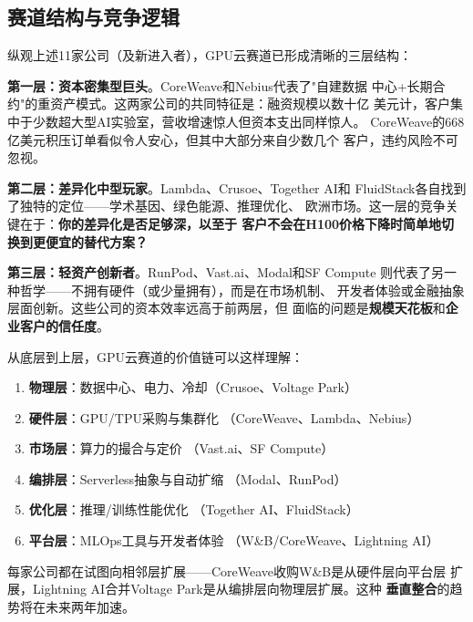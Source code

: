 
\subsection{赛道结构与竞争逻辑}
\label{subsec:gpu-cloud-landscape}

纵观上述11家公司（及新进入者），GPU云赛道已形成清晰的三层结构：

\textbf{第一层：资本密集型巨头}。CoreWeave和Nebius代表了"自建数据
中心+长期合约"的重资产模式。这两家公司的共同特征是：融资规模以数十亿
美元计，客户集中于少数超大型AI实验室，营收增速惊人但资本支出同样惊人。
CoreWeave的668亿美元积压订单看似令人安心，但其中大部分来自少数几个
客户，违约风险不可忽视。

\textbf{第二层：差异化中型玩家}。Lambda、Crusoe、Together AI和
FluidStack各自找到了独特的定位——学术基因、绿色能源、推理优化、
欧洲市场。这一层的竞争关键在于：\textbf{你的差异化是否足够深，以至于
客户不会在H100价格下降时简单地切换到更便宜的替代方案？}

\textbf{第三层：轻资产创新者}。RunPod、Vast.ai、Modal和SF Compute
则代表了另一种哲学——不拥有硬件（或少量拥有），而是在市场机制、
开发者体验或金融抽象层面创新。这些公司的资本效率远高于前两层，但
面临的问题是\textbf{规模天花板}和\textbf{企业客户的信任度}。

\begin{corebox}
从底层到上层，GPU云赛道的价值链可以这样理解：
\begin{enumerate}
  \item \textbf{物理层}：数据中心、电力、冷却（Crusoe、Voltage Park）
  \item \textbf{硬件层}：GPU/TPU采购与集群化
    （CoreWeave、Lambda、Nebius）
  \item \textbf{市场层}：算力的撮合与定价
    （Vast.ai、SF Compute）
  \item \textbf{编排层}：Serverless抽象与自动扩缩
    （Modal、RunPod）
  \item \textbf{优化层}：推理/训练性能优化
    （Together AI、FluidStack）
  \item \textbf{平台层}：MLOps工具与开发者体验
    （W\&B/CoreWeave、Lightning AI）
\end{enumerate}
每家公司都在试图向相邻层扩展——CoreWeave收购W\&B是从硬件层向平台层
扩展，Lightning AI合并Voltage Park是从编排层向物理层扩展。这种
\textbf{垂直整合}的趋势将在未来两年加速。
\end{corebox}

